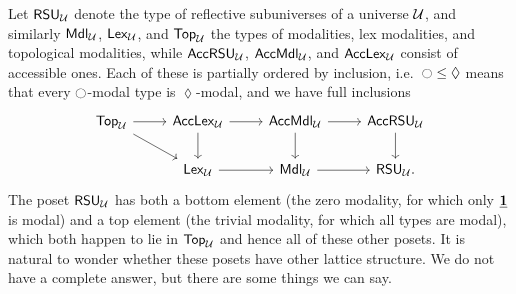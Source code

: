 Let $\rsu[\UU]$ denote the type of reflective subuniverses of a universe $\UU$, and similarly $\mdl[\UU]$, $\lex[\UU]$, and $\tpl[\UU]$ the types of modalities, lex modalities, and topological modalities, while $\accrsu$, $\accmdl$, and $\acclex$ consist of accessible ones.
Each of these is partially ordered by inclusion, i.e.\ $\modal \le \lozenge$ means that every $\modal$-modal type is $\lozenge$-modal, and we have full inclusions
\[
\begin{tikzcd}
  \tpl \ar[r] \ar[dr] & \acclex \ar[r] \ar[d] & \accmdl \ar[r] \ar[d] & \accrsu \ar[d] \\
  & \lex \ar[r] & \mdl \ar[r] & \rsu.
\end{tikzcd}
\]
The poset $\rsu$ has both a bottom element (the zero modality, for which only $\unit$ is modal) and a top element (the trivial modality, for which all types are modal), which both happen to lie in $\tpl$ and hence all of these other posets.
It is natural to wonder whether these posets have other lattice structure.
We do not have a complete answer, but there are some things we can say.

